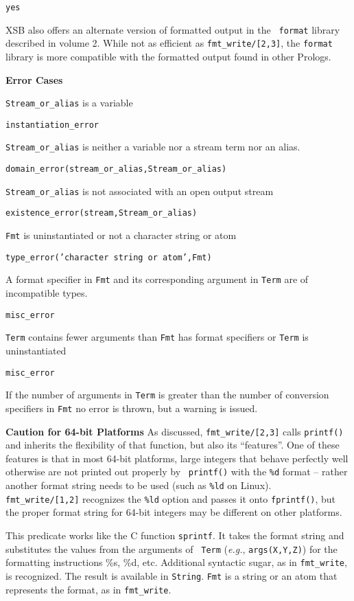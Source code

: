 \begin{description}
{\begin{verbatim}
yes
\end{verbatim}
}
%
XSB also offers an alternate version of formatted output in the {\tt
  format} library described in volume 2.  While not as efficient as
{\tt fmt\_write/[2,3]}, the {\tt format} library is more compatible
with the formatted output found in other Prologs.

{\bf Error Cases}
\bi
\item 	{\tt Stream\_or\_alias} is a variable
\bi
\item {\tt instantiation\_error}
\ei
\item 	{\tt Stream\_or\_alias} is neither a variable nor a stream term nor an alias.
\bi
\item 	{\tt domain\_error(stream\_or\_alias,Stream\_or\_alias)}
\ei
\item 	{\tt Stream\_or\_alias} is not associated with an open output stream
\bi
\item 	{\tt existence\_error(stream,Stream\_or\_alias)}
\ei
\item {\tt Fmt} is uninstantiated or not a character string or atom
\bi
\item   {\tt type\_error('character string or atom',Fmt)}
\ei
\item A format specifier in {\tt Fmt} and its corresponding argument
  in {\tt Term} are of incompatible types.
\bi
\item   {\tt misc\_error}
\ei
\item {\tt Term} contains fewer arguments than {\tt Fmt} has format
  specifiers or {\tt Term} is uninstantiated
\bi
\item   {\tt misc\_error}
\ei
\ei

If the number of arguments in {\tt Term} is greater than the number of
conversion specifiers in {\tt Fmt} no error is thrown, but a warning
is issued.

{\bf Caution for 64-bit Platforms}
%
As discussed, {\tt fmt\_write/[2,3]} calls {\tt printf()} and inherits
the flexibility of that function, but also its ``features''.  One of
these features is that in most 64-bit platforms, large integers that
behave perfectly well otherwise are not printed out properly by {\tt
  printf()} with the {\tt \%d} format -- rather another format string
needs to be used (such as {\tt \%ld} on Linux).  {\tt
  fmt\_write/[1,2]} recognizes the {\tt \%ld} option and passes it
onto {\tt fprintf()}, but the proper format string for 64-bit integers
may be different on other platforms.

    This predicate works like the C function {\tt sprintf}. It takes the
    format string and substitutes the values from the arguments of {\tt
      Term} ({\it e.g.}, {\tt args(X,Y,Z)}) for the formatting instructions
    \%s, \%d, etc. Additional syntactic sugar, as in \verb|fmt_write|, is
    recognized. The result is available in {\tt String}. {\tt Fmt} is a
    string or an atom that represents the format, as in
    {\tt fmt\_write}.
    

\end{description}
